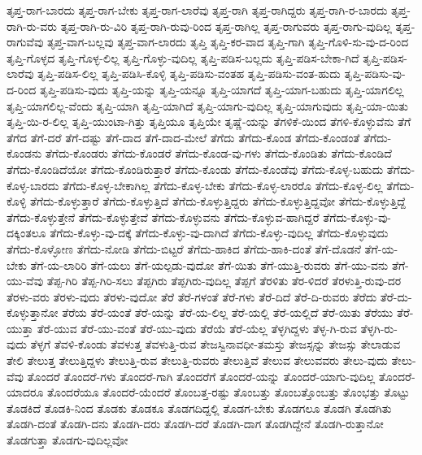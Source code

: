 {ತೃಪ್ತ-ರಾಗ-ಬಾರದು
ತೃಪ್ತ-ರಾಗ-ಬೇಕು
ತೃಪ್ತ-ರಾಗ-ಲಾರೆವು
ತೃಪ್ತ-ರಾಗಿ
ತೃಪ್ತ-ರಾಗಿದ್ದರು
ತೃಪ್ತ-ರಾಗಿ-ರ-ಬಾರದು
ತೃಪ್ತ-ರಾಗಿ-ರು-ವರು
ತೃಪ್ತ-ರಾಗಿ-ರು-ವಿರಿ
ತೃಪ್ತ-ರಾಗಿ-ರುವು-ರಿಂದ
ತೃಪ್ತ-ರಾಗಿಲ್ಲ
ತೃಪ್ತ-ರಾಗುವರು
ತೃಪ್ತ-ರಾಗು-ವುದಿಲ್ಲ
ತೃಪ್ತ-ರಾಗುವೆವು
ತೃಪ್ತ-ವಾಗ-ಬಲ್ಲವು
ತೃಪ್ತ-ವಾಗ-ಲಾರದು
ತೃಪ್ತಿ
ತೃಪ್ತಿ-ಕರ-ವಾದ
ತೃಪ್ತಿ-ಗಾಗಿ
ತೃಪ್ತಿ-ಗೊಳಿ-ಸು-ವು-ದ-ರಿಂದ
ತೃಪ್ತಿ-ಗೊಳ್ಳದ
ತೃಪ್ತಿ-ಗೊಳ್ಳ-ಲಿಲ್ಲ
ತೃಪ್ತಿ-ಗೊಳ್ಳು-ವುದಿಲ್ಲ
ತೃಪ್ತಿ-ಪಡಿಸ-ಬಲ್ಲದು
ತೃಪ್ತಿ-ಪಡಿಸ-ಬೇಕಾ-ಗಿದೆ
ತೃಪ್ತಿ-ಪಡಿಸ-ಲಾರೆವು
ತೃಪ್ತಿ-ಪಡಿಸ-ಲಿಲ್ಲ
ತೃಪ್ತಿ-ಪಡಿಸಿ-ಕೊಳ್ಳಿ
ತೃಪ್ತಿ-ಪಡಿಸು-ವಂತಹ
ತೃಪ್ತಿ-ಪಡಿಸು-ವಂತ-ಹುದು
ತೃಪ್ತಿ-ಪಡಿಸು-ವು-ದ-ರಿಂದ
ತೃಪ್ತಿ-ಪಡಿಸು-ವುದು
ತೃಪ್ತಿ-ಯನ್ನು
ತೃಪ್ತಿ-ಯನ್ನೂ
ತೃಪ್ತಿ-ಯಾಗದೆ
ತೃಪ್ತಿ-ಯಾಗ-ಬಹುದು
ತೃಪ್ತಿ-ಯಾಗಲಿಲ್ಲ
ತೃಪ್ತಿ-ಯಾಗಲಿಲ್ಲ-ವೆಂದು
ತೃಪ್ತಿ-ಯಾಗಿ
ತೃಪ್ತಿ-ಯಾಗಿದೆ
ತೃಪ್ತಿ-ಯಾಗು-ವುದಿಲ್ಲ
ತೃಪ್ತಿ-ಯಾಗುವುದು
ತೃಪ್ತಿ-ಯಾ-ಯಿತು
ತೃಪ್ತಿ-ಯಿ-ರ-ಲಿಲ್ಲ
ತೃಪ್ತಿ-ಯುಂಟಾ-ಗಿತ್ತು
ತೃಪ್ತಿಯೂ
ತೃಪ್ತಿಯೇ
ತೃಷ್ಣೆ-ಯನ್ನು
ತೆಗಳಿಕೆ-ಯಿಂದ
ತೆಗಳಿ-ಕೊಳ್ಳುವೆನು
ತೆಗೆ
ತೆಗೆದ
ತೆಗೆ-ದರೆ
ತೆಗೆ-ದಷ್ಟು
ತೆಗೆ-ದಾದ
ತೆಗೆ-ದಾದ-ಮೇಲೆ
ತೆಗೆದು
ತೆಗೆದು-ಕೊಂಡ
ತೆಗೆದು-ಕೊಂಡಂತೆ
ತೆಗೆದು-ಕೊಂಡನು
ತೆಗೆದು-ಕೊಂಡರು
ತೆಗೆದು-ಕೊಂಡರೆ
ತೆಗೆದು-ಕೊಂಡ-ವು-ಗಳು
ತೆಗೆದು-ಕೊಂಡಿತು
ತೆಗೆದು-ಕೊಂಡಿದೆ
ತೆಗೆದು-ಕೊಂಡಿದೆಯೋ
ತೆಗೆದು-ಕೊಂಡಿರುತ್ತಾರೆ
ತೆಗೆದು-ಕೊಂಡು
ತೆಗೆದು-ಕೊಂಡೆವು
ತೆಗೆದು-ಕೊಳ್ಳ-ಬಹುದು
ತೆಗೆದು-ಕೊಳ್ಳ-ಬಾರದು
ತೆಗೆದು-ಕೊಳ್ಳ-ಬೇಕಾಗಿಲ್ಲ
ತೆಗೆದು-ಕೊಳ್ಳ-ಬೇಕು
ತೆಗೆದು-ಕೊಳ್ಳ-ಲಾರರೊ
ತೆಗೆದು-ಕೊಳ್ಳ-ಲಿಲ್ಲ
ತೆಗೆದು-ಕೊಳ್ಳಿ
ತೆಗೆದು-ಕೊಳ್ಳುತ್ತಾರೆ
ತೆಗೆದು-ಕೊಳ್ಳುತ್ತಿದೆ
ತೆಗೆದು-ಕೊಳ್ಳುತ್ತಿದ್ದರು
ತೆಗೆದು-ಕೊಳ್ಳುತ್ತಿದ್ದವೋ
ತೆಗೆದು-ಕೊಳ್ಳುತ್ತಿದ್ದೆ
ತೆಗೆದು-ಕೊಳ್ಳುತ್ತೇನೆ
ತೆಗೆದು-ಕೊಳ್ಳುತ್ತೇವೆ
ತೆಗೆದು-ಕೊಳ್ಳುವನು
ತೆಗೆದು-ಕೊಳ್ಳುವ-ಹಾಗಿದ್ದರೆ
ತೆಗೆದು-ಕೊಳ್ಳು-ವು-ದಕ್ಕಿಂತಲೂ
ತೆಗೆದು-ಕೊಳ್ಳು-ವು-ದಕ್ಕೆ
ತೆಗೆದು-ಕೊಳ್ಳು-ವು-ದಾಗಿದೆ
ತೆಗೆದು-ಕೊಳ್ಳು-ವುದಿಲ್ಲ
ತೆಗೆದು-ಕೊಳ್ಳುವುದು
ತೆಗೆದು-ಕೊಳ್ಳೋಣ
ತೆಗೆದು-ನೋಡಿ
ತೆಗೆದು-ಬಿಟ್ಟರೆ
ತೆಗೆದು-ಹಾಕಿದ
ತೆಗೆದು-ಹಾಕಿ-ದಂತೆ
ತೆಗೆ-ದೊಡನೆ
ತೆಗೆ-ಯ-ಬೇಕು
ತೆಗೆ-ಯ-ಲಾರಿರಿ
ತೆಗೆ-ಯಲು
ತೆಗೆ-ಯಲ್ಪಡು-ವುದೋ
ತೆಗೆ-ಯಿತು
ತೆಗೆ-ಯುತ್ತಿ-ರುವರು
ತೆಗೆ-ಯು-ವನು
ತೆಗೆ-ಯು-ವೆವು
ತೆಪ್ಪ-ಗಿರಿ
ತೆಪ್ಪ-ಗಿರಿ-ಸಲು
ತೆಪ್ಪಗಿರು
ತೆಪ್ಪಗಿರು-ವುದಿಲ್ಲ
ತೆಪ್ಪಗೆ
ತೆರಳಿತು
ತೆರ-ಳಿದರೆ
ತೆರಳುತ್ತಿ-ರುವು-ದರ
ತೆರಳು-ವರು
ತೆರಳು-ವುದು
ತೆರಳು-ವುದೋ
ತೆರೆ
ತೆರೆ-ಗಳಂತೆ
ತೆರೆ-ಗಳು
ತೆರೆ-ದಿದೆ
ತೆರೆ-ದಿ-ರುವರು
ತೆರೆದು
ತೆರೆ-ದು-ಕೊಳ್ಳುತ್ತಾನೋ
ತೆರೆಯ
ತೆರೆ-ಯಂತೆ
ತೆರೆ-ಯನ್ನು
ತೆರೆ-ಯ-ಲಿಲ್ಲ
ತೆರೆ-ಯಲ್ಲಿ
ತೆರೆ-ಯಲ್ಲಿದೆ
ತೆರೆ-ಯಿತು
ತೆರೆಯು
ತೆರೆ-ಯುತ್ತಾ
ತೆರೆ-ಯುವ
ತೆರೆ-ಯು-ವಂತೆ
ತೆರೆ-ಯು-ವುದು
ತೆರೆಯೆ
ತೆರೆ-ಯೆಲ್ಲ
ತೆಳ್ಳಗಿದ್ದಳು
ತೆಳ್ಳ-ಗಿ-ರುವ
ತೆಳ್ಳಗಿ-ರು-ವುದು
ತೆಳ್ಳಗೆ
ತೆವಳಿ-ಕೊಂಡು
ತೆವಳುತ್ತ
ತೆವಳುತ್ತಿ-ರುವ
ತೇಜಸ್ವಿನಾವಧೀ-ತಮಸ್ತು
ತೇಜಸ್ಸನ್ನು
ತೇಜಸ್ಸು
ತೇಲಾಡುವ
ತೇಲಿ
ತೇಲುತ್ತ
ತೇಲುತ್ತಿದ್ದಳು
ತೇಲುತ್ತಿ-ರುವ
ತೇಲುತ್ತಿ-ರುವರು
ತೇಲುತ್ತಿವೆ
ತೇಲುವ
ತೇಲುವವರು
ತೇಲು-ವುದು
ತೇಲು-ವೆವು
ತೊಂದರೆ
ತೊಂದರೆ-ಗಳು
ತೊಂದರೆ-ಗಾಗಿ
ತೊಂದರೆಗೆ
ತೊಂದರೆ-ಯನ್ನು
ತೊಂದರೆ-ಯಾಗು-ವುದಿಲ್ಲ
ತೊಂದರೆ-ಯಾದರೂ
ತೊಂದರೆಯೂ
ತೊಂದರೆ-ಯೆಂದರೆ
ತೊಂಬತ್ತ-ರಷ್ಟು
ತೊಂಬತ್ತು
ತೊಂಬತ್ತೊಂಬತ್ತು
ತೊಂಭತ್ತು
ತೊಟ್ಟು
ತೊಡಕಿದೆ
ತೊಡಕಿ-ನಿಂದ
ತೊಡಕು
ತೊಡಕೂ
ತೊಡಗದಿದ್ದಲ್ಲಿ
ತೊಡಗ-ಬೇಕು
ತೊಡಗಲೂ
ತೊಡಗಿ
ತೊಡಗಿತು
ತೊಡಗಿ-ದಂತೆ
ತೊಡಗಿ-ದನು
ತೊಡಗಿ-ದರು
ತೊಡಗಿ-ದರೆ
ತೊಡಗಿ-ದಾಗ
ತೊಡಗಿದ್ದೇನೆ
ತೊಡಗಿ-ರುತ್ತಾನೋ
ತೊಡಗುತ್ತಾ
ತೊಡಗು-ವುದಿಲ್ಲವೋ
}
